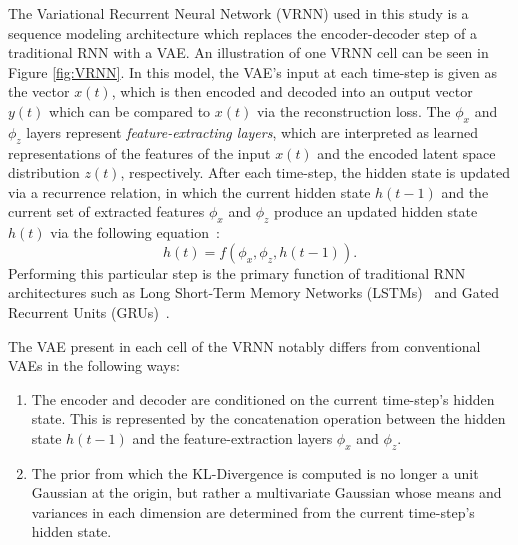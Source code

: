\documentclass[12pt, a4paper]{article}
\begin{document}
The Variational Recurrent Neural Network (VRNN) used in this study is a sequence modeling architecture
which replaces the encoder-decoder step of a traditional RNN with a VAE. 
An illustration of one VRNN cell can be seen
in Figure \ref{fig:VRNN}. 
In this model, the VAE's input at each time-step is given as the vector $x(t)$, which is then encoded and decoded into an output vector $y(t)$ which can be compared to $x(t)$ via the reconstruction loss.
The $\phi_{x}$ and $\phi_{z}$ layers represent \textit{feature-extracting layers}, which are interpreted as learned representations of the features of the input $x(t)$ and the encoded latent space distribution $z(t)$, respectively. 
After each time-step, the hidden state is updated via a recurrence relation, in which the current hidden state $h(t-1)$ and the current set of extracted features $\phi_{x}$ and $\phi_{z}$ produce an updated hidden state $h(t)$ via the following equation~\cite{chung2016recurrent}:
\begin{equation}
	h(t) = f(\phi_{x}, \phi_{z}, h(t-1)).
\end{equation} 
Performing this particular step is the primary function of traditional RNN architectures such as Long Short-Term Memory Networks (LSTMs)~\cite{lstm} and Gated Recurrent Units (GRUs)~\cite{cho2014learning}. %

The VAE present in each cell of the VRNN notably differs from
conventional VAEs in the following ways:
\begin{enumerate}
  \item{The encoder and decoder are conditioned on the current time-step's hidden state.
  This is represented by the concatenation operation between the hidden state $h(t-1)$ and the feature-extraction layers $\phi_{x}$ and $\phi_{z}$.}
  \item{The prior from which the KL-Divergence is computed is no longer a unit Gaussian
  at the origin, but rather a multivariate Gaussian whose means and variances in each 
  dimension are determined from the current time-step's hidden state.}
\end{enumerate}
\end{document}
